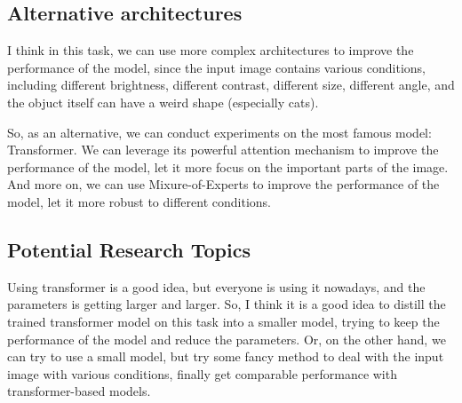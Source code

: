 
\subsection{Alternative architectures}
I think in this task, we can use more complex architectures to improve the performance of the model, since the input image contains various conditions, including different brightness, different contrast, different size, different angle, and the objuct itself can have a weird shape (especially cats).

So, as an alternative, we can conduct experiments on the most famous model: Transformer.
We can leverage its powerful attention mechanism to improve the performance of the model, let it more focus on the important parts of the image. And more on, we can use Mixure-of-Experts to improve the performance of the model, let it more robust to different conditions.

\subsection{Potential Research Topics}
Using transformer is a good idea, but everyone is using it nowadays, and the parameters is getting larger and larger.
So, I think it is a good idea to distill the trained transformer model on this task into a smaller model, trying to keep the performance of the model and reduce the parameters.
Or, on the other hand, we can try to use a small model, but try some fancy method to deal with the input image with various conditions, finally get comparable performance with transformer-based models.

